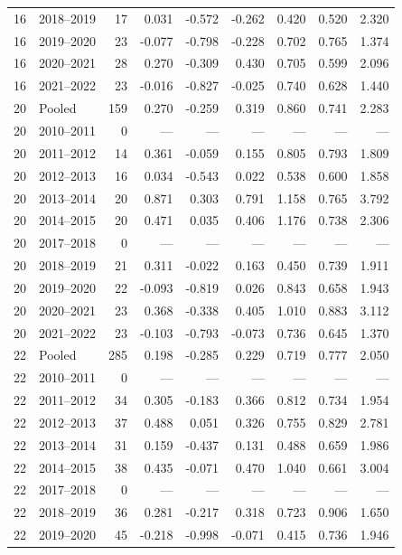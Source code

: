 \begin{longtable}{llrrrrrrr}
16 & 2018--2019 & 17 & 0.031 & -0.572 & -0.262 & 0.420 & 0.520 & 2.320 \\
16 & 2019--2020 & 23 & -0.077 & -0.798 & -0.228 & 0.702 & 0.765 & 1.374 \\
16 & 2020--2021 & 28 & 0.270 & -0.309 & 0.430 & 0.705 & 0.599 & 2.096 \\
16 & 2021--2022 & 23 & -0.016 & -0.827 & -0.025 & 0.740 & 0.628 & 1.440 \\
20 & Pooled & 159 & 0.270 & -0.259 & 0.319 & 0.860 & 0.741 & 2.283 \\
20 & 2010--2011 & 0 & --- & --- & --- & --- & --- & --- \\
20 & 2011--2012 & 14 & 0.361 & -0.059 & 0.155 & 0.805 & 0.793 & 1.809 \\
20 & 2012--2013 & 16 & 0.034 & -0.543 & 0.022 & 0.538 & 0.600 & 1.858 \\
20 & 2013--2014 & 20 & 0.871 & 0.303 & 0.791 & 1.158 & 0.765 & 3.792 \\
20 & 2014--2015 & 20 & 0.471 & 0.035 & 0.406 & 1.176 & 0.738 & 2.306 \\
20 & 2017--2018 & 0 & --- & --- & --- & --- & --- & --- \\
20 & 2018--2019 & 21 & 0.311 & -0.022 & 0.163 & 0.450 & 0.739 & 1.911 \\
20 & 2019--2020 & 22 & -0.093 & -0.819 & 0.026 & 0.843 & 0.658 & 1.943 \\
20 & 2020--2021 & 23 & 0.368 & -0.338 & 0.405 & 1.010 & 0.883 & 3.112 \\
20 & 2021--2022 & 23 & -0.103 & -0.793 & -0.073 & 0.736 & 0.645 & 1.370 \\
22 & Pooled & 285 & 0.198 & -0.285 & 0.229 & 0.719 & 0.777 & 2.050 \\
22 & 2010--2011 & 0 & --- & --- & --- & --- & --- & --- \\
22 & 2011--2012 & 34 & 0.305 & -0.183 & 0.366 & 0.812 & 0.734 & 1.954 \\
22 & 2012--2013 & 37 & 0.488 & 0.051 & 0.326 & 0.755 & 0.829 & 2.781 \\
22 & 2013--2014 & 31 & 0.159 & -0.437 & 0.131 & 0.488 & 0.659 & 1.986 \\
22 & 2014--2015 & 38 & 0.435 & -0.071 & 0.470 & 1.040 & 0.661 & 3.004 \\
22 & 2017--2018 & 0 & --- & --- & --- & --- & --- & --- \\
22 & 2018--2019 & 36 & 0.281 & -0.217 & 0.318 & 0.723 & 0.906 & 1.650 \\
22 & 2019--2020 & 45 & -0.218 & -0.998 & -0.071 & 0.415 & 0.736 & 1.946 \\

\end{longtable}
